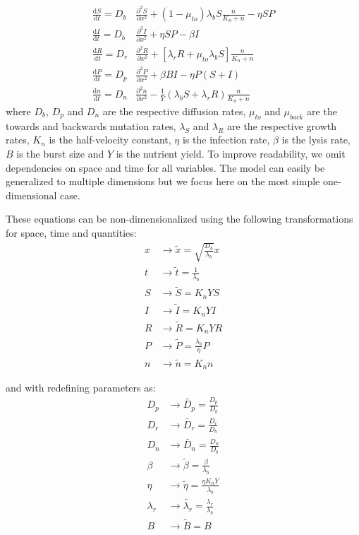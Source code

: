 \begin{align}
    \frac{\text{d}S}{\text{d}t} = D_b &\frac{\partial^2S}{\partial x^2} + \left( 1 - \mu_{to} \right) \lambda_b S \frac{n}{K_n+n}  - \eta SP \\
    \frac{\text{d}I}{\text{d}t} = D_b &\frac{\partial^2I}{\partial x^2} + \eta SP - \beta I\\
    \frac{\text{d}R}{\text{d}t} = D_r &\frac{\partial^2R}{\partial x^2} + \left[\lambda_r R + \mu_{to} \lambda_b S \right] \frac{n}{K_n+n}\\
    \frac{\text{d}P}{\text{d}t} = D_p &\frac{\partial^2P}{\partial x^2} + \beta BI - \eta P(S+I) \\
    \frac{\text{d}n}{\text{d}t} = D_n &\frac{\partial^2n}{\partial x^2} - \frac{1}{Y} \left( \lambda_b S + \lambda_r R \right) \frac{n}{K_n+n}
\end{align}
where $D_b$, $D_p$ and $D_n$ are the respective diffusion rates, $\mu_{to}$ and $\mu_{back}$ are the towards and backwards mutation rates, $\lambda_S$ and $\lambda_R$ are the respective growth rates, $K_n$ is the half-velocity constant, $\eta$ is the infection rate, $\beta$ is the lysis rate, $B$ is the burst size and $Y$ is the nutrient yield. To improve readability, we omit dependencies on space and time for all variables. The model can easily be generalized to multiple dimensions but we focus here on the most simple one-dimensional case.

These equations can be non-dimensionalized using the following transformations for space, time and quantities:
\begin{align}
    x &\rightarrow \tilde{x} = \sqrt{\frac{D_b}{\lambda_b}} x \\
    t &\rightarrow \tilde{t} = \frac{1}{\lambda_b} \\
    S &\rightarrow \tilde{S} = K_n Y S \\
    I &\rightarrow \tilde{I} = K_n Y I \\ 
    R &\rightarrow \tilde{R} = K_n Y R \\
    P &\rightarrow \tilde{P} = \frac{\lambda_b}{\eta} P \\
    n &\rightarrow \tilde{n} = K_n n
\end{align}

and with redefining parameters as:
\begin{align}
    D_p &\rightarrow \tilde{D_p} = \frac{D_p}{D_b} \\
    D_r &\rightarrow \tilde{D_r} = \frac{D_r}{D_b} \\
    D_n &\rightarrow \tilde{D_n} = \frac{D_n}{D_b} \\
    \beta &\rightarrow \tilde{\beta} = \frac{\beta}{\lambda_b} \\
    \eta &\rightarrow \tilde{\eta} = \frac{\eta K_n Y}{\lambda_b} \\
    \lambda_r &\rightarrow \tilde{\lambda_r} = \frac{\lambda_r}{\lambda_b} \\
    B &\rightarrow \tilde{B} = B
\end{align}

